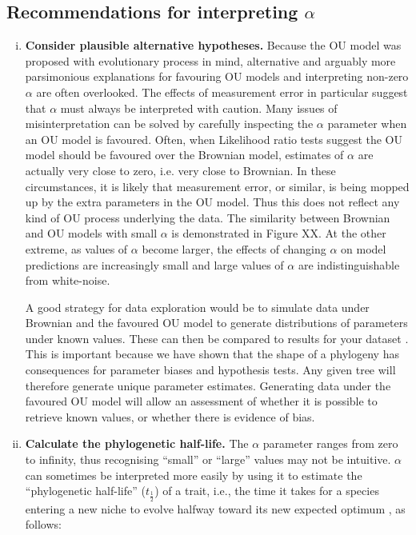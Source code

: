 \documentclass[a4paper,12pt]{article}
\begin{document}
  \subsection{Recommendations for interpreting $\alpha$}    
    \begin{enumerate}[(i)]
    \item \textbf{Consider plausible alternative hypotheses.}
    Because the OU model was proposed with evolutionary process in mind, alternative and arguably more parsimonious explanations for favouring OU models and interpreting non-zero $\alpha$ are often overlooked. 
    The effects of measurement error in particular suggest that $\alpha$ must always be interpreted with caution. 
    Many issues of misinterpretation can be solved by carefully inspecting the $\alpha$ parameter when an OU model is favoured. 
    Often, when Likelihood ratio tests suggest the OU model should be favoured over the Brownian model, estimates of $\alpha$ are actually very close to zero, i.e. very close to Brownian.
    In these circumstances, it is likely that measurement error, or similar, is being mopped up by the extra parameters in the OU model. 
    Thus this does not reflect any kind of OU process underlying the data. 
    The similarity between Brownian and OU models with small $\alpha$ is demonstrated in Figure XX. %
    At the other extreme, as values of $\alpha$ become larger, the effects of changing $\alpha$ on model predictions are increasingly small and large values of $\alpha$ are indistinguishable from white-noise.  
    
    A good strategy for data exploration would be to simulate data under Brownian and the favoured OU model to generate distributions of parameters under known values. 
    These can then be compared to results for your dataset \citep[see][for a related approach]{slater2013robust}. 
    This is important because we have shown that the shape of a phylogeny has consequences for parameter biases and hypothesis tests. 
    Any given tree will therefore generate unique parameter estimates. 
    Generating data under the favoured OU model will allow an assessment of whether it is possible to retrieve known values, or whether there is evidence of bias. 
    
	  \item \textbf{Calculate the phylogenetic half-life.}
    The $\alpha$ parameter ranges from zero to infinity, thus recognising ``small'' or ``large'' values may not be intuitive. 
    $\alpha$ can sometimes be interpreted more easily by using it to estimate the ``phylogenetic half-life'' ($t_\frac{1}{2}$) of a trait, i.e., the time it takes for a species entering a new niche to evolve halfway toward its new expected optimum \citep{hansen1997stabilizing}, as follows:


\end{enumerate}
\end{document}
